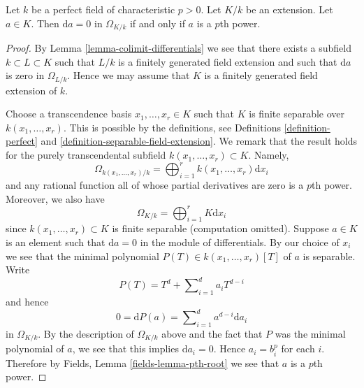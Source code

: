 \begin{lemma}
\label{lemma-derivative-zero-pth-power}
Let $k$ be a perfect field of characteristic $p > 0$.
Let $K/k$ be an extension.
Let $a \in K$. Then $\text{d}a = 0$ in $\Omega_{K/k}$
if and only if $a$ is a $p$th power.
\end{lemma}

\begin{proof}
By Lemma \ref{lemma-colimit-differentials} we see that there exists a subfield
$k \subset L \subset K$ such that $L/k$
is a finitely generated field extension and such that
$\text{d}a$ is zero in $\Omega_{L/k}$.
Hence we may assume that $K$ is a finitely generated field extension
of $k$.

\medskip\noindent
Choose a transcendence basis $x_1, \ldots, x_r \in K$
such that $K$ is finite separable over $k(x_1, \ldots, x_r)$.
This is possible by the definitions, see
Definitions \ref{definition-perfect} and
\ref{definition-separable-field-extension}.
We remark that the result holds for the purely transcendental
subfield $k(x_1, \ldots, x_r) \subset K$.
Namely,
$$
\Omega_{k(x_1, \ldots, x_r)/k} =
\bigoplus\nolimits_{i = 1}^r k(x_1, \ldots, x_r) \text{d}x_i
$$
and any rational function all of whose partial derivatives are zero
is a $p$th power. Moreover, we also have
$$
\Omega_{K/k} =
\bigoplus\nolimits_{i = 1}^r K\text{d}x_i
$$
since $k(x_1, \ldots, x_r) \subset K$ is finite separable
(computation omitted). Suppose $a \in K$ is an element such that
$\text{d}a = 0$ in the module of differentials. By our choice of $x_i$ we
see that the minimal polynomial $P(T) \in k(x_1, \ldots, x_r)[T]$
of $a$ is separable. Write
$$
P(T) = T^d + \sum\nolimits_{i = 1}^d a_i T^{d - i}
$$
and hence
$$
0 = \text{d}P(a) = \sum\nolimits_{i = 1}^d a^{d - i}\text{d}a_i
$$
in $\Omega_{K/k}$. By the description of
$\Omega_{K/k}$ above and the fact that $P$ was the minimal
polynomial of $a$, we see that this implies $\text{d}a_i = 0$.
Hence $a_i = b_i^p$ for each $i$. Therefore by
Fields, Lemma \ref{fields-lemma-pth-root}
we see that $a$ is a $p$th power.
\end{proof}
